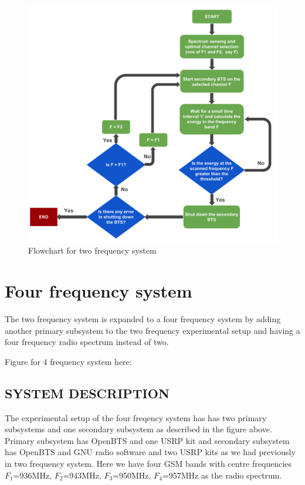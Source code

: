 \begin{figure}[!h]
\centering
\includegraphics[width=1\textwidth]{freqSys2}
\caption[Two frequency system]{Flowchart for two frequency system}
\label{freqSys2}
\end{figure}

\section{Four frequency system}
The two frequency system is expanded to a four frequency system by adding 
another primary subsystem to the two frequency experimental setup and having 
a four frequency radio spectrum instead of two. 


Figure for 4 frequency system here:

\subsection{SYSTEM DESCRIPTION}
 The experimental setup of the four freqency system has 
has two primary subsystems and one secondary subsystem as described in the figure above. Primary subsystem 
has OpenBTS and one USRP kit and secondary subsystem has OpenBTS and GNU radio 
software and two USRP kits as we had previously in two frequency system. 
Here we have four GSM bands with centre frequencies 
$F_1$=936MHz, $F_2$=943MHz, $F_3$=950MHz, $F_4$=957MHz as the radio spectrum.
 



